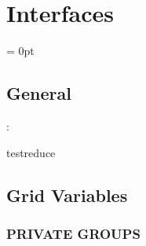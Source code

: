 
\section{Interfaces} 


\parskip = 0pt

\vspace{3mm} \subsection*{General}

: 

testreduce
\vspace{2mm}
\subsection*{Grid Variables}
\vspace{5mm}\subsubsection{PRIVATE GROUPS}

\vspace{5mm}

